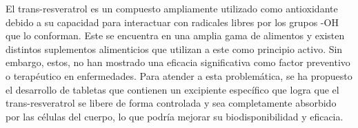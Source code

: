 El trans-resveratrol es un compuesto ampliamente utilizado como antioxidante debido
 a su capacidad para interactuar con radicales libres por los grupos -OH que 
 lo conforman. Este se encuentra en una amplia gama de alimentos y 
 existen distintos suplementos alimenticios que utilizan a este como principio activo.
 Sin embargo, estos, no han mostrado una eficacia
 significativa como factor preventivo o terapéutico en enfermedades.
 Para atender a esta problemática, se ha propuesto el desarrollo de tabletas
 que contienen un excipiente específico que logra que el trans-resveratrol
 se libere de forma controlada y sea completamente absorbido por las células
 del cuerpo, lo que podría mejorar su biodisponibilidad y eficacia.
 